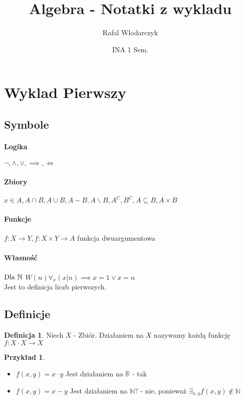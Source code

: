 \documentclass{article}
\author{Rafal Wlodarczyk}
\title{Algebra - Notatki z wykladu}
\date{INA 1 Sem.}
\theoremstyle{definition}
\newtheorem{de}{Definicja}[subsection]
\theoremstyle{definition}
\theoremstyle{definition}
\newtheorem{pk}{Przykład}[subsection]
\theoremstyle{definition}
\begin{document}
\maketitle

\section{Wyklad Pierwszy}

\subsection{Symbole}

\paragraph{Logika}

$\neg, \land, \lor, \implies, \iff$

\paragraph{Zbiory}

$x\in A, A \cap B, A \cup B, A - B, A\backslash B, A^C, B^C, A\subseteq B, A\times B$

\paragraph{Funkcje}

$f: X\rightarrow Y, f: X\times Y\rightarrow A$ funkcja dwuargumentowa

\paragraph{Własność}

$\\\text{Dla } \mathbb{N}$
$W(n) \forall_{x} (x|n)\implies x=1 \lor x=n$
\\Jest to definicja liczb pierwszych.

\subsection{Definicje}

\begin{de}
Niech $X$ - Zbiór. Działaniem na $X$ nazywamy każdą funkcję $f:X\cdot X\rightarrow X$
\end{de}

\begin{pk}
\begin{itemize}
Rozważmy następujące przykłady:

\item $f(x,y)=x\cdot y$ Jest działaniem na $\mathbb{R}$ - tak
\item $f(x,y)=x-y$ Jest działaniem na $\mathbb{N}$? - nie, ponieważ $\exists_{x,y} f(x,y)\notin \mathbb{N}$
\end{itemize}
\end{pk}
\end{document}
